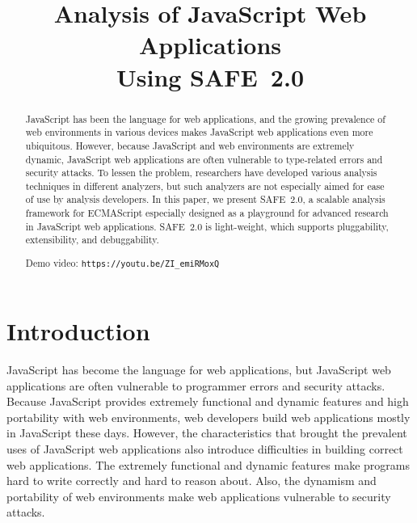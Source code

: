 \documentclass[10pt, conference]{IEEEtran}
\newcommand{\safe}{{SAFE~2.0}\xspace}
\begin{document}
\title{\hspace*{-.7em}
Analysis of JavaScript Web Applications\\ Using \safe}

\author{
\and
{}
\and
{}
\and
{}
}
\maketitle


\begin{abstract}
JavaScript has been the language for web applications, and
the growing prevalence of web environments in various devices
makes JavaScript web applications even more ubiquitous.
However, because JavaScript and web environments are
extremely dynamic, JavaScript web applications are often
vulnerable to type-related errors and security attacks.
To lessen the problem, researchers have developed various analysis
techniques in different analyzers, but such analyzers are not especially
aimed for ease of use by analysis developers.  In this paper, we present \safe, a scalable
analysis framework for ECMAScript especially designed as a playground
for advanced research in JavaScript web applications.  \safe is
light-weight, which supports pluggability, extensibility, and
debuggability.

Demo video: {\small\verb!https://youtu.be/ZI_emiRMoxQ!}
\end{abstract}


\section{Introduction}
JavaScript has become the language for web applications, but
JavaScript web applications are often vulnerable to programmer
errors and security attacks.  Because JavaScript provides
extremely functional and dynamic features and high portability
with web environments, web developers build web applications
mostly in JavaScript these days.  However, the characteristics
that brought the prevalent uses of JavaScript web applications
also introduce difficulties in building correct web applications.
The extremely functional and dynamic features make programs
hard to write correctly and hard to reason about.
Also, the dynamism and portability of web environments make
web applications vulnerable to security attacks.
\end{document}

